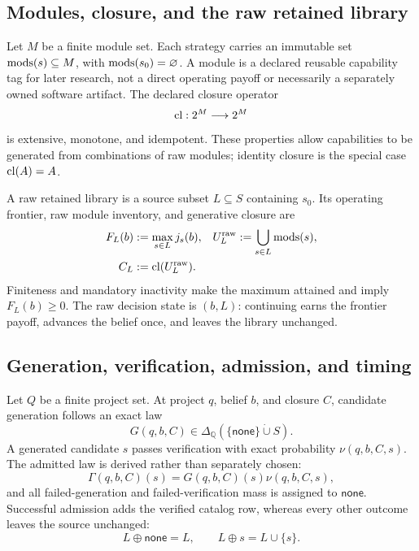 \subsection{Modules, closure, and the raw retained library}

Let \(M\) be a finite module set.  Each strategy carries an immutable set
\(\operatorname{mods}(s)\subseteq M\), with \(\operatorname{mods}(s_0)=\varnothing\).  A module is a
declared reusable capability tag for later research, not a direct operating
payoff or necessarily a separately owned software artifact.  The
declared closure operator
\[
  \operatorname{cl}:2^M\longrightarrow 2^M
\]
is extensive, monotone, and idempotent.  These properties allow capabilities
to be generated from combinations of raw modules; identity closure is the
special case \(\operatorname{cl}(A)=A\).

A raw retained library is a source subset \(L\subseteq S\) containing
\(s_0\).  Its operating frontier, raw module inventory, and generative closure
are
\begin{align}
  F_L(b)&:=\max_{s\in L}j_s(b),
  &U_L^{\mathrm{raw}}&:=\bigcup_{s\in L}\operatorname{mods}(s),
  \label{eq:frontier-union}\\
  C_L&:=\operatorname{cl}(U_L^{\mathrm{raw}}).
  \label{eq:raw-library-closure}
\end{align}
Finiteness and mandatory inactivity make the maximum attained and imply
\(F_L(b)\geq0\).  The raw decision state is \((b,L)\): continuing earns the
frontier payoff, advances the belief once, and leaves the library unchanged.

\subsection{Generation, verification, admission, and timing}

Let \(Q\) be a finite project set.  At project \(q\), belief \(b\), and
closure \(C\), candidate generation follows an exact law
\[
  G(q,b,C)\in\Delta_{\mathbb Q}(\{\mathsf{none}\}\mathbin{\dot\cup}S).
\]
A generated candidate \(s\) passes verification with exact probability
\(\nu(q,b,C,s)\).  The admitted law is derived rather than separately chosen:
\begin{equation}
  \Gamma(q,b,C)(s)=G(q,b,C)(s)\nu(q,b,C,s),
  \label{eq:admitted-law-main}
\end{equation}
and all failed-generation and failed-verification mass is assigned to
\(\mathsf{none}\).  Successful admission adds the verified catalog row,
whereas every other outcome leaves the source unchanged:
\begin{equation}
  L\oplus\mathsf{none}=L,
  \qquad L\oplus s=L\cup\{s\}.
  \label{eq:raw-library-update}
\end{equation}

